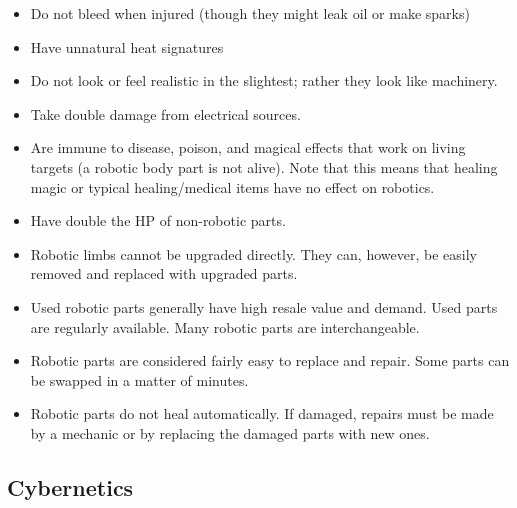 \documentclass[twoside]{book}
\begin{document}
\begin{itemize}
      
  \item   Do not bleed when injured (though they might leak
                 oil or make sparks) 
  \item   Have unnatural heat signatures 
  \item   Do not look or feel realistic in the slightest;
                 rather they look like machinery. 
  \item   Take double damage from electrical sources.
                 
  \item   Are immune to disease, poison, and magical
                 effects that work on living targets (a robotic body part
                 is not alive). Note that this means that healing magic
                 or typical healing/medical items have no effect on
                 robotics. 
  \item   Have double the HP of non-robotic parts. 
  \item   Robotic limbs cannot be upgraded directly. They
                 can, however, be easily removed and replaced with
                 upgraded parts. 
  \item   Used robotic parts generally have high resale
                 value and demand. Used parts are regularly available.
                 Many robotic parts are interchangeable. 
  \item   Robotic parts are considered fairly easy to
                 replace and repair. Some parts can be swapped in a
                 matter of minutes. 
  \item   Robotic parts do not heal automatically. If
                 damaged, repairs must be made by a mechanic or by
                 replacing the damaged parts with new ones. 
\end{itemize}
  
    

\subsection{Cybernetics}
    
\end{document}
